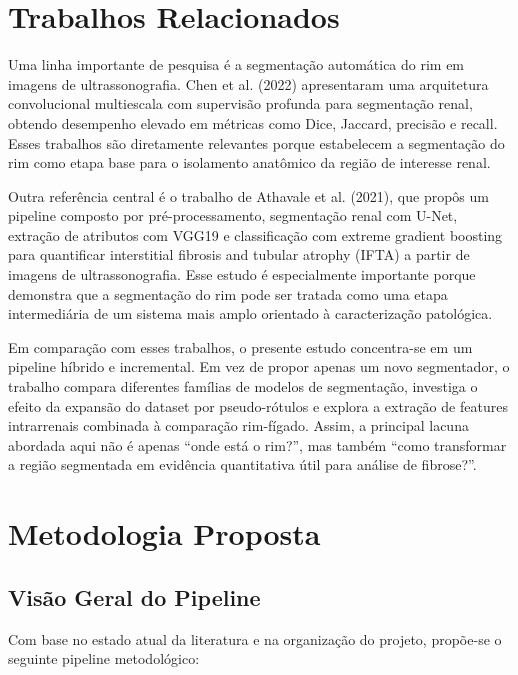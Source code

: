 \documentclass[12pt]{article}
\begin{document}
\section{Trabalhos Relacionados}

Uma linha importante de pesquisa é a segmentação automática do rim em imagens de ultrassonografia. Chen et al. (2022) apresentaram uma arquitetura convolucional multiescala com supervisão profunda para segmentação renal, obtendo desempenho elevado em métricas como Dice, Jaccard, precisão e recall. Esses trabalhos são diretamente relevantes porque estabelecem a segmentação do rim como etapa base para o isolamento anatômico da região de interesse renal.

Outra referência central é o trabalho de Athavale et al. (2021), que propôs um pipeline composto por pré-processamento, segmentação renal com U-Net, extração de atributos com VGG19 e classificação com extreme gradient boosting para quantificar interstitial fibrosis and tubular atrophy (IFTA) a partir de imagens de ultrassonografia. Esse estudo é especialmente importante porque demonstra que a segmentação do rim pode ser tratada como uma etapa intermediária de um sistema mais amplo orientado à caracterização patológica.

Em comparação com esses trabalhos, o presente estudo concentra-se em um pipeline híbrido e incremental. Em vez de propor apenas um novo segmentador, o trabalho compara diferentes famílias de modelos de segmentação, investiga o efeito da expansão do dataset por pseudo-rótulos e explora a extração de features intrarrenais combinada à comparação rim-fígado. Assim, a principal lacuna abordada aqui não é apenas “onde está o rim?”, mas também “como transformar a região segmentada em evidência quantitativa útil para análise de fibrose?”.

\section{Metodologia Proposta}

\subsection{Visão Geral do Pipeline}

Com base no estado atual da literatura e na organização do projeto, propõe-se o seguinte pipeline metodológico:
\end{document}
